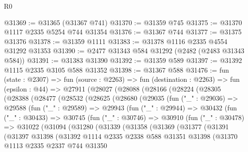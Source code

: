 \begin{lexlean}{R0}
\begin{coremodule}
@31369 := @31365 (@31367 @741)
@31370 := @31359 @745
@31375 := @31370 @1117 @2335 @5254 @744 @31354
@31376 := @31367 @744
@31377 := @31375 @31376
@31378 := @31359 @1111
@31383 := @31378 @1116 @2335 @4554 @31292 @31353
@31390 := @2477 @31343 @584 @31292 (@2482 (@2483 @31343 @584))
@31391 := @31383 @31390
@31392 := @31359 @589
@31397 := @31392 @1115 @2335 @3105 @588 @31352
@31398 := @31367 @588
@31476 := fun (state : @2307) =>
  fun (source : @2263) =>
  fun (destination : @2263) =>
  fun (epsilon : @44) =>
  @27911
    (@28027
      (@28088
        (@28166
          (@28224
            (@28305
              (@28388
                (@28477
                  (@28532
                    (@28625
                      (@28680
                        (@29035
                          (fun ("_" : @29036) =>
                          @29588
                            (fun ("_" : @29589) =>
                            @29943
                              (fun ("_" : @29944) =>
                              @30432
                                (fun ("_" : @30433) =>
                                @30745
                                  (fun ("_" : @30746) =>
                                  @30910
                                    (fun ("_" : @30478) =>
                                    @31022
                                      (@31094
                                        (@31280
                                          (@31339
                                            (@31358
                                              (@31369
                                                (@31377
                                                  (@31391
                                                    (@31397
                                                      @31398
                                                      (@31392
                                                        @1114
                                                        @2335
                                                        @2338
                                                        @588
                                                        @31351
                                                        @31398
                                                        (@31370
                                                          @1113
                                                          @2335
                                                          @2337
                                                          @744
                                                          @31350

\end{coremodule}
\end{lexlean}
